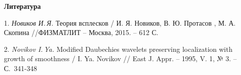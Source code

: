 \smallskip \centerline{\bf Литература}\nopagebreak

1. {\it Новиков И.\,Я.} Теория всплесков /  И. Я. Новиков, В. Ю. Протасов , М. А. Скопина
//ФИЗМАТЛИТ -- Москва, 2015. -- 612 С.

2. {\it Novikov I.\,Ya.} Modified Daubechies wavelets preserving localization with growth of smoothness / I. Ya. Novikov
// East J. Appr. -- 1995, V. 1, № 3. -- С.~341-348
